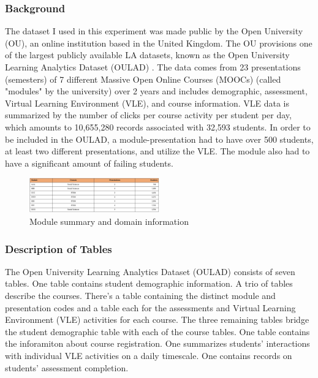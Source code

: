 \documentclass{article}
\begin{document}
        \subsubsection{Background}
            The dataset I used in this experiment was made public by the Open University (OU), an online institution based in the United Kingdom.
            The OU provisions one of the largest publicly available LA datasets, known as the Open University Learning Analytics Dataset (OULAD) \cite{oulad}.
            The data comes from 23 presentations (semesters) of 7 different Massive Open Online Courses (MOOCs) (called "modules" by the university) over 2 years and includes demographic, assessment, Virtual Learning Environment (VLE), and course information.
            VLE data is summarized by the number of clicks per course activity per student per day, which amounts to 10,655,280 records associated with 32,593 students.
            In order to be included in the OULAD, a module-presentation had to have over 500 students, at least two different presentations, and utilize the VLE.
            The module also had to have a significant amount of failing students.

            \begin{figure}
                \includegraphics[width=0.5\textwidth]{oulad_students_courses}
                \caption{Module summary and domain information \cite{oulad}}
                \label{fig:oulad_students_courses}
            \end{figure}

        \subsubsection{Description of Tables}
        
            The Open University Learning Analytics Dataset (OULAD) consists of seven tables.
            One table contains student demographic information. 
            A trio of tables describe the courses. 
            There's a table containing the distinct module and presentation codes and a table each for the assessments and Virtual Learning Environment (VLE) activities for each course.
            The three remaining tables bridge the student demographic table with each of the course tables. 
            One table contains the inforamiton about course registration.
            One summarizes students' interactions with individual VLE activities on a daily timescale.
            One contains records on students' assessment completion.
\end{document}
